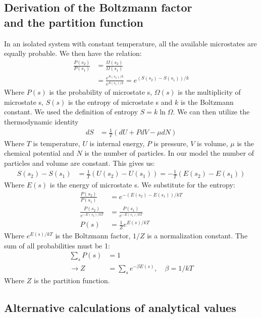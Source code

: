 \documentclass[%
 reprint,
nofootinbib,
aps,
]{revtex4-1}
\begin{document}
\subsection{Derivation of the Boltzmann factor\\ and the partition function}
In an isolated system with constant temperature, all the available microstates are equally probable. We then have the relation:
\begin{align*}
    \frac{P(s_2)}{P(s_1)} &= \frac{\Omega (s_2)}{\Omega (s_1)}\\
    &= \frac{e^{S(s_2)/k}}{e^{S(s_1)/k}} = e^{(S(s_2) - S(s_1))/k}
\end{align*}
Where $P(s)$ is the probability of microstate s, $\Omega (s)$ is the multiplicity of microstate s, $S (s)$ is the entropy of microstate s and $k$ is the Boltzmann constant. We used the definition of entropy $S = k \ln \Omega$. We can then utilize the thermodynamic identity
\begin{align*}
    dS &= \frac{1}{T} (dU + PdV - \mu dN)
\end{align*}
Where $T$ is temperature, $U$ is internal energy, $P$ is pressure, $V$ is volume, $\mu$ is the chemical potential and $N$ is the number of particles. In our model the number of particles and volume are constant. This gives us:
\begin{align*}
    S(s_2) - S(s_1) &= \frac{1}{T} (U(s_2) - U(s_1)) = -\frac{1}{T} (E(s_2) - E(s_1)) 
\end{align*}
Where $E(s)$ is the energy of microstate s. We substitute for the entropy:
\begin{align*}
    \frac{P(s_2)}{P(s_1)} &= e^{-(E(s_2) - E(s_1))/kT}\\
    \frac{P(s_2)}{e^{-E(s_2)/kT}} &= \frac{P(s_1)}{e^{-E(s_1)/kT}}\\
    P(s) &= \frac{1}{Z} e^{E(s)/kT}
\end{align*}
Where $e^{E(s)/kT}$ is the Boltzmann factor, $1/Z$ is a normalization constant. The sum of all probabilities must be 1:
\begin{align*}
    \sum_s P(s) &= 1\\
    \rightarrow Z &= \sum_s e^{- \beta E(s)}, \quad \beta = 1/kT
\end{align*}
Where $Z$ is the partition function.


\subsection{Alternative calculations of analytical values}
\end{document}
